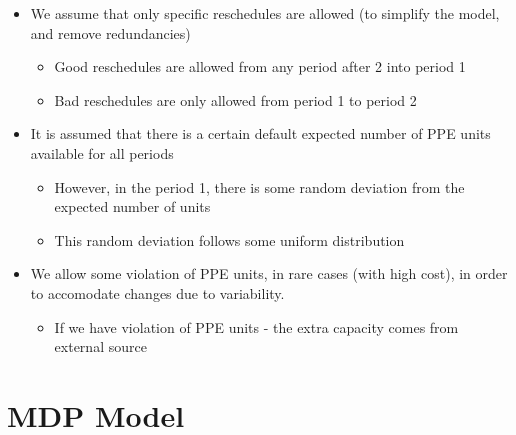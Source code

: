 \documentclass{article}
\begin{document}
\begin{itemize}
	\item We assume that only specific reschedules are allowed (to simplify the model, and remove  redundancies)
	\begin{itemize}
		\item Good reschedules are allowed from any period after 2 into period 1
		\item Bad reschedules are only allowed from period 1 to period 2
	\end{itemize}
	
	\item It is assumed that there is a certain default expected number of PPE units available for all periods
	\begin{itemize}
		\item However, in the period 1, there is some random deviation from the expected number of units
		\item This random deviation follows some uniform distribution
	\end{itemize}
	\item We allow some violation of PPE units, in rare cases (with high cost), in order to accomodate changes due to variability.
	\begin{itemize}
		\item If we have violation of PPE units - the extra capacity comes from external source
	\end{itemize}
\end{itemize}


\section{MDP Model}
\end{document}
